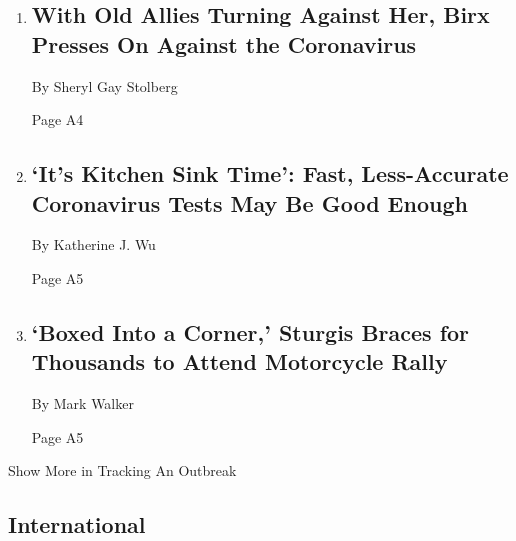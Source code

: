 \begin{enumerate}
\def\labelenumi{\arabic{enumi}.}
\item
  \href{/2020/08/06/us/politics/birx-coronavirus.html}{}

  \hypertarget{with-old-allies-turning-against-her-birx-presses-on-against-the-coronavirus}{%
  \subsection{With Old Allies Turning Against Her, Birx Presses On
  Against the
  Coronavirus}\label{with-old-allies-turning-against-her-birx-presses-on-against-the-coronavirus}}

  By Sheryl Gay Stolberg

  Page A4
\item
  \href{/2020/08/06/health/rapid-Covid-tests.html}{}

  \hypertarget{its-kitchen-sink-time-fast-less-accurate-coronavirus-tests-may-be-good-enough-1}{%
  \subsection{`It's Kitchen Sink Time': Fast, Less-Accurate Coronavirus
  Tests May Be Good
  Enough}\label{its-kitchen-sink-time-fast-less-accurate-coronavirus-tests-may-be-good-enough-1}}

  By Katherine J. Wu

  Page A5
\item
  \href{/2020/08/06/us/sturgis-motorcyle-rally-coronavirus.html}{}

  \hypertarget{boxed-into-a-corner-sturgis-braces-for-thousands-to-attend-motorcycle-rally}{%
  \subsection{`Boxed Into a Corner,' Sturgis Braces for Thousands to
  Attend Motorcycle
  Rally}\label{boxed-into-a-corner-sturgis-braces-for-thousands-to-attend-motorcycle-rally}}

  By Mark Walker

  Page A5
\end{enumerate}

Show More in Tracking An Outbreak

\hypertarget{international}{%
\subsection{International}\label{international}}

